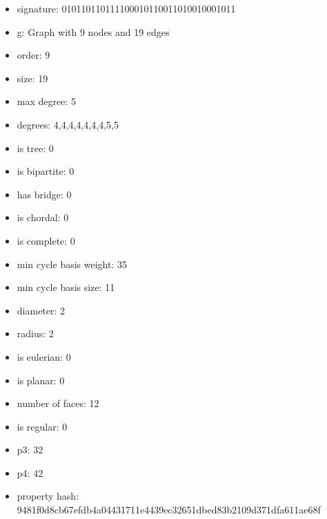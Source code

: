 \newpage
\begin{figure}
\end{figure}
\begin{itemize}
\item signature: 010110110111100010110011010010001011
\item g: Graph with 9 nodes and 19 edges
\item order: 9
\item size: 19
\item max degree: 5
\item degrees: 4,4,4,4,4,4,4,5,5
\item is tree: 0
\item is bipartite: 0
\item has bridge: 0
\item is chordal: 0
\item is complete: 0
\item min cycle basis weight: 35
\item min cycle basis size: 11
\item diameter: 2
\item radius: 2
\item is eulerian: 0
\item is planar: 0
\item number of faces: 12
\item is regular: 0
\item p3: 32
\item p4: 42
\item property hash: 9481f0d8cb67efdb4a04431711e4439ec32651dbed83b2109d371dfa611ae68f
\end{itemize}
